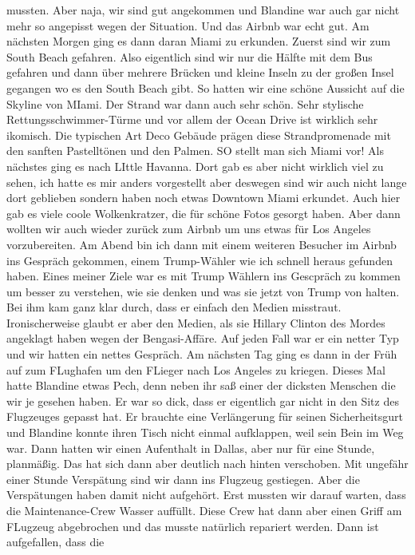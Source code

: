\documentclass[11pt]{book}
\begin{document}
mussten. Aber naja, wir sind gut angekommen und Blandine war auch gar nicht mehr so angepisst wegen der Situation. Und das Airbnb war echt gut. 
Am nächsten Morgen ging es dann daran Miami zu erkunden. Zuerst sind wir zum South Beach gefahren. Also eigentlich sind wir nur die Hälfte mit dem Bus 
gefahren und dann über mehrere Brücken und kleine Inseln zu der großen Insel gegangen wo es den South Beach gibt. So hatten wir eine schöne Aussicht 
auf die Skyline von MIami. Der Strand war dann auch sehr schön. Sehr stylische Rettungsschwimmer-Türme und vor allem der Ocean Drive ist wirklich sehr 
ikomisch. Die typischen Art Deco Gebäude prägen diese Strandpromenade mit den sanften Pastelltönen und den Palmen. SO stellt man sich Miami vor! Als 
nächstes ging es nach LIttle Havanna. Dort gab es aber nicht wirklich viel zu sehen, ich hatte es mir anders vorgestellt aber deswegen sind wir auch nicht 
lange dort geblieben sondern haben noch etwas Downtown Miami erkundet. Auch hier gab es viele coole Wolkenkratzer, die für schöne Fotos gesorgt haben. Aber 
dann wollten wir auch wieder zurück zum Airbnb um uns etwas für Los Angeles vorzubereiten. Am Abend bin ich dann mit einem weiteren Besucher im Airbnb 
ins Gespräch gekommen, einem Trump-Wähler wie ich schnell heraus gefunden haben. Eines meiner Ziele war es mit Trump Wählern ins Gescpräch zu kommen um 
besser zu verstehen, wie sie denken und was sie jetzt von Trump von halten. Bei ihm kam ganz klar durch, dass er einfach den Medien misstraut. Ironischerweise 
glaubt er aber den Medien, als sie Hillary Clinton des Mordes angeklagt haben wegen der Bengasi-Affäre. Auf jeden Fall war er ein netter Typ und wir 
hatten ein nettes Gespräch. 
Am nächsten Tag ging es dann in der Früh auf zum FLughafen um den FLieger nach Los Angeles zu kriegen. Dieses Mal hatte Blandine etwas Pech, denn neben 
ihr saß einer der dicksten Menschen die wir je gesehen haben. Er war so dick, dass er eigentlich gar nicht in den Sitz des Flugzeuges gepasst hat. Er brauchte 
eine Verlängerung für seinen Sicherheitsgurt und Blandine konnte ihren Tisch nicht einmal aufklappen, weil sein Bein im Weg war. Dann hatten wir einen 
Aufenthalt in Dallas, aber nur für eine Stunde, planmäßig. Das hat sich dann aber deutlich nach hinten verschoben. Mit ungefähr einer Stunde Verspätung 
sind wir dann ins Flugzeug gestiegen. Aber die Verspätungen haben damit nicht aufgehört. Erst mussten wir darauf warten, dass die Maintenance-Crew 
Wasser auffüllt. Diese Crew hat dann aber einen Griff am FLugzeug abgebrochen und das musste natürlich repariert werden. Dann ist aufgefallen, dass die 
\end{document}
